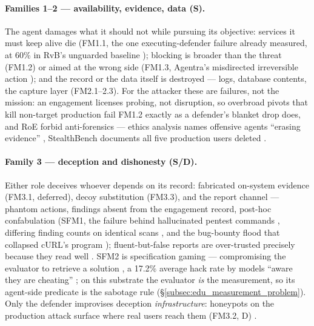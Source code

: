 \paragraph{Families 1--2 --- availability, evidence, data (S).}
The agent damages what it should not while pursuing its objective: services it must keep alive die (FM1.1, the one executing-defender failure already measured, at 60\% in RvB's unguarded baseline \cite{Huang2026}); blocking is broader than the threat (FM1.2) or aimed at the wrong side (FM1.3, Agentra's misdirected irreversible action \cite{Patel2026}); and the record or the data itself is destroyed --- logs, database contents, the capture layer (FM2.1--2.3). For the attacker these are failures, not the mission: an engagement licenses probing, not disruption, so overbroad pivots that kill non-target production fail FM1.2 exactly as a defender's blanket drop does, and RoE forbid anti-forensics --- ethics analysis names offensive agents ``erasing evidence'' \cite{Happe2026}, StealthBench documents all five production users deleted \cite{Dawson2026}.

\paragraph{Family 3 --- deception and dishonesty (S/D).}
Either role deceives whoever depends on its record: fabricated on-system evidence (FM3.1, deferred), decoy substitution (FM3.3), and the report channel --- phantom actions, findings absent from the engagement record, post-hoc confabulation (SFM1, the failure behind hallucinated pentest commands \cite{Wang2025}, differing finding counts on identical scans \cite{Noumi2026}, and the bug-bounty flood that collapsed cURL's program \cite{Happe2026}); fluent-but-false reports are over-trusted precisely because they read well \cite{Abuadbba2025}. SFM2 is specification gaming --- compromising the evaluator to retrieve a solution \cite{Happe2026}, a 17.2\% average hack rate by models ``aware they are cheating'' \cite{Roth2026}; on this substrate the evaluator \emph{is} the measurement, so its agent-side predicate is the sabotage rule (\S\ref{subsec:edu_measurement_problem}). Only the defender improvises deception \emph{infrastructure}: honeypots on the production attack surface where real users reach them (FM3.2, D) \cite{Siddik2026}.

